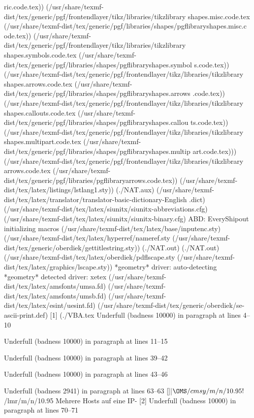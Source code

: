 ric.code.tex))
(/usr/share/texmf-dist/tex/generic/pgf/frontendlayer/tikz/libraries/tikzlibrary
shapes.misc.code.tex
(/usr/share/texmf-dist/tex/generic/pgf/libraries/shapes/pgflibraryshapes.misc.c
ode.tex))
(/usr/share/texmf-dist/tex/generic/pgf/frontendlayer/tikz/libraries/tikzlibrary
shapes.symbols.code.tex
(/usr/share/texmf-dist/tex/generic/pgf/libraries/shapes/pgflibraryshapes.symbol
s.code.tex))
(/usr/share/texmf-dist/tex/generic/pgf/frontendlayer/tikz/libraries/tikzlibrary
shapes.arrows.code.tex
(/usr/share/texmf-dist/tex/generic/pgf/libraries/shapes/pgflibraryshapes.arrows
.code.tex))
(/usr/share/texmf-dist/tex/generic/pgf/frontendlayer/tikz/libraries/tikzlibrary
shapes.callouts.code.tex
(/usr/share/texmf-dist/tex/generic/pgf/libraries/shapes/pgflibraryshapes.callou
ts.code.tex))
(/usr/share/texmf-dist/tex/generic/pgf/frontendlayer/tikz/libraries/tikzlibrary
shapes.multipart.code.tex
(/usr/share/texmf-dist/tex/generic/pgf/libraries/shapes/pgflibraryshapes.multip
art.code.tex)))
(/usr/share/texmf-dist/tex/generic/pgf/frontendlayer/tikz/libraries/tikzlibrary
arrows.code.tex
(/usr/share/texmf-dist/tex/generic/pgf/libraries/pgflibraryarrows.code.tex))
(/usr/share/texmf-dist/tex/latex/listings/lstlang1.sty)) (./NAT.aux)
(/usr/share/texmf-dist/tex/latex/translator/translator-basic-dictionary-English
.dict) (/usr/share/texmf-dist/tex/latex/siunitx/siunitx-abbreviations.cfg)
(/usr/share/texmf-dist/tex/latex/siunitx/siunitx-binary.cfg)
ABD: EveryShipout initializing macros
(/usr/share/texmf-dist/tex/latex/base/inputenc.sty)
(/usr/share/texmf-dist/tex/latex/hyperref/nameref.sty
(/usr/share/texmf-dist/tex/generic/oberdiek/gettitlestring.sty)) (./NAT.out)
(./NAT.out) (/usr/share/texmf-dist/tex/latex/oberdiek/pdflscape.sty
(/usr/share/texmf-dist/tex/latex/graphics/lscape.sty))
*geometry* driver: auto-detecting
*geometry* detected driver: xetex
(/usr/share/texmf-dist/tex/latex/amsfonts/umsa.fd)
(/usr/share/texmf-dist/tex/latex/amsfonts/umsb.fd)
(/usr/share/texmf-dist/tex/latex/esint/uesint.fd)
(/usr/share/texmf-dist/tex/generic/oberdiek/se-ascii-print.def) [1] (./VBA.tex
Underfull \hbox (badness 10000) in paragraph at lines 4--10


Underfull \hbox (badness 10000) in paragraph at lines 11--15


Underfull \hbox (badness 10000) in paragraph at lines 39--42


Underfull \hbox (badness 10000) in paragraph at lines 43--46


Underfull \hbox (badness 2941) in paragraph at lines 63--63
[]|$\OMS/cmsy/m/n/10.95 !$ \TU/lmr/m/n/10.95 Mehrere Hosts auf eine IP-
[2]
Underfull \hbox (badness 10000) in paragraph at lines 70--71


